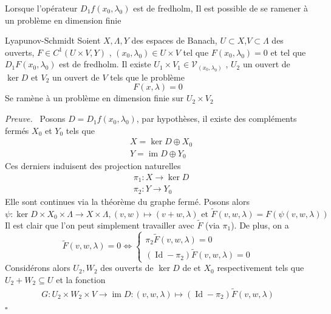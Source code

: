 \documentclass[a4paper,12pt,oneside,titlepage]{article}
\renewcommand{\tilde}[1]{\widetilde{#1}}
\newcommand{\im}[0]{\operatorname{im}}
\theoremstyle{definition}
\theoremstyle{plain}
\newenvironment{preuve}
{\par\noindent\textit{Preuve.}\ }
{\hfill$\square$\par}
\begin{document}
Lorsque l'opérateur $D_1f(x_0,\lambda_0)$ est de fredholm, Il est possible de se ramener à un problème en dimension finie
\begin{theobox}{Lyapunov-Schmidt}{}\label{LP-redux}
Soient $X,\Lambda,Y$ des espaces de 
Banach, $U\subset X$,$V\subset \Lambda$ 
des ouverts, $F\in C^1(U\times V,Y)$ , $(x_0,\lambda_0)\in U\times V$ tel que $F(x_0,\lambda_0)=0$ et tel que $D_1F(x_0,\lambda_0)$ est de fredholm. Il existe $U_1\times V_1 \in\mathcal{V}_{(x_0,\lambda_0)}$ , $U_2$ un ouvert de $\ker D$ et $V_2$ un ouvert de $V$ 
tels que le problème
\begin{equation*}
    F(x,\lambda)=0 
\end{equation*} 
Se ramène à un problème en dimension finie sur $U_2\times V_2$
\end{theobox}
\begin{preuve}
    Posons $D=D_1f(x_0,\lambda_0)$,
    par hypothèses, il existe des compléments fermés $X_0$  et $Y_0$ tels que
    \begin{align*}
        &X=\ker D\oplus X_0\\
        &Y=\im D \oplus Y_0
    \end{align*}
    Ces derniers induisent des projection naturelles
    \begin{align*}
        &\pi_1 : X\rightarrow \ker D\\
        &\pi_2 : Y\rightarrow Y_0
    \end{align*}
    Elle sont continues via la théorème du graphe fermé.
    Posons alors
    \begin{equation*}
        \psi : \ker D\times X_0\times \Lambda \rightarrow X\times \Lambda , (v,w)\mapsto (v+w,\lambda) \text{ et } \tilde{F}(v,w,\lambda)= F(\psi(v,w,\lambda))
    \end{equation*}
    Il est clair que l'on peut simplement travailler avec $\tilde{F}$ (via $\pi_1$). De plus, on a 
    \begin{equation*} 
        \tilde{F}(v,w, \lambda) = 0 \iff 
\begin{cases} 
    \pi_2 \tilde{F}(v,w,\lambda) = 0 \\ 
    (\operatorname*{Id} - \pi_2) \tilde{F}(v,w, \lambda) = 0 
\end{cases}
    \end{equation*}
Considérons alors   $U_2,W_2$  des ouverts de $\ker D$  de et $X_0$ respectivement tels que $U_2+W_2\subseteq U$ et la fonction 
\begin{eqnarray*}
    G: U_2\times W_2\times V\rightarrow \im D: (v,w,\lambda)\mapsto (\operatorname*{Id}-\pi_2) \tilde{F}(v,w,\lambda)

\end{eqnarray*}
\end{preuve}
\end{document}
